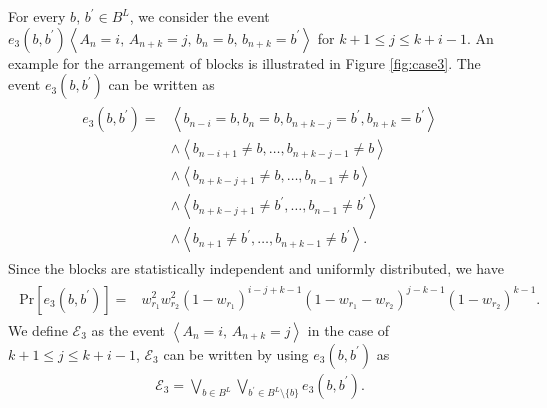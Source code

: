 \documentclass[dvipdfmx,english]{ampmt} %
\begin{document}
For every $b,\, b^\prime \in B^L$, we consider the event $e_3(b,b^\prime) \left< A_n=i ,\, A_{n+k}=j,\,b_n=b,\,b_{n+k}=b^\prime\right>$ for $k+1 \leq j \leq k+i-1$. 
An example for the arrangement of blocks is illustrated in Figure \ref{fig:case3}.
The event $e_3(b,b^\prime)$ can be written as
\begin{align}
\begin{split}
  \label{eq:e_3}
  e_3 \left(b,b^\prime\right) = 
  &\left< b_{n-i} = b , b_{n} = b , b_{n+k-j} = b^\prime , b_{n+k} = b^\prime \right> \\
  &\land \left< b_{n-i+1} \neq b, \dots, b_{n+k-j-1} \neq b \right> \\
  &\land \left< b_{n+k-j+1} \neq b, \dots, b_{n-1} \neq b \right> \\
  &\land \left< b_{n+k-j+1} \neq b^\prime, \dots, b_{n-1} \neq b^\prime \right> \\
  &\land \left< b_{n+1} \neq b^\prime , \dots, b_{n+k-1} \neq b^\prime \right>.
\end{split}
\end{align}
Since the blocks are statistically independent and uniformly distributed, we have
\begin{align}
\begin{split}
  \label{eq:probability_e3}
  \mathrm{Pr} \left[ e_3 \left(b,b^\prime\right) \right] 
  =& w_{r_1}^2 w_{r_2}^2 
  (1-w_{r_1})^{i-j+k-1} 
  (1-w_{r_1}-w_{r_2})^{j-k-1}
  (1-w_{r_2})^{k-1}.
\end{split}
\end{align}
We define $\mathcal{E}_3$ as the event $\left< A_n=i ,\, A_{n+k}=j \right>$ in the case of $k+1 \leq j \leq k+i-1$, $\mathcal{E}_3$ can be written by using $e_3(b,b^\prime)$ as
\begin{align}\label{eq:E_3}
  \mathcal{E}_3 = \bigvee_{b \in B^L} \bigvee_{b^\prime \in B^L \setminus \{b\}} e_3 \left(b,b^\prime\right).
\end{align}
\end{document}

